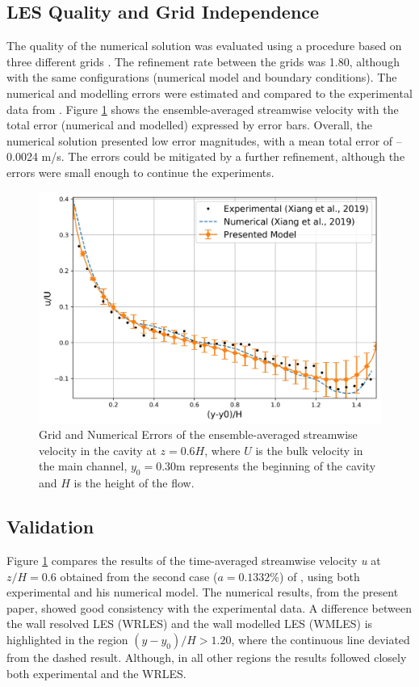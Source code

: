 \subsection{LES Quality and Grid Independence}
The quality of the numerical solution was evaluated using a procedure based on three different grids \cite{Dutta2018}. The refinement rate between the grids was 1.80, although with the same configurations (numerical model and boundary conditions). The numerical and modelling errors were estimated and compared to the experimental data from \textcite{xiang2019}. Figure \ref{fig:art4:validation} shows the ensemble-averaged streamwise velocity with the total error (numerical and modelled) expressed by error bars. Overall, the numerical solution presented low error magnitudes, with a mean total error of –0.0024 m/s. The errors could be mitigated by a further refinement, although the errors were small enough to continue the experiments.

\begin{figure}[!htb]
\centering
\includegraphics[width=\linewidth]{../images/art4/validation.jpeg}
\caption{Grid and Numerical Errors of the ensemble-averaged streamwise velocity in the cavity at $z=0.6H$, where $U$ is the bulk velocity in the main channel, $y_0=0.30$m represents the beginning of the cavity and $H$ is the height of the flow.}
\label{fig:art4:validation}
\end{figure}
\subsection{Validation}
Figure \ref{fig:art4:validation} compares the results of the time-averaged streamwise velocity \textit{u} at $z/H=0.6$ obtained from the second case ($a=0.1332$\%) of \textcite{xiang2019}, using both experimental and his numerical model. The numerical results, from the present paper, showed good consistency with the experimental data. A difference between the wall resolved LES (WRLES) and the wall modelled LES (WMLES) is highlighted in the region $(y-y_0)/H > 1.20$, where the continuous line deviated from the dashed result. Although, in all other regions the results followed closely both experimental and the WRLES.

